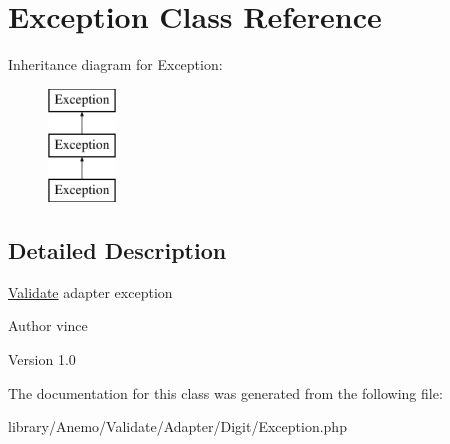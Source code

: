\hypertarget{class_anemo_1_1_validate_1_1_adapter_1_1_digit_1_1_exception}{
\section{Exception Class Reference}
\label{class_anemo_1_1_validate_1_1_adapter_1_1_digit_1_1_exception}
}
Inheritance diagram for Exception:\begin{figure}[H]
\begin{center}
\leavevmode
\includegraphics[height=3.000000cm]{class_anemo_1_1_validate_1_1_adapter_1_1_digit_1_1_exception}
\end{center}
\end{figure}


\subsection{Detailed Description}
\hyperlink{class_anemo_1_1_validate}{Validate} adapter exception \begin{DoxyAuthor}{Author}
vince 
\end{DoxyAuthor}
\begin{DoxyVersion}{Version}
1.0 
\end{DoxyVersion}


The documentation for this class was generated from the following file:\begin{DoxyCompactItemize}
\item 
library/Anemo/Validate/Adapter/Digit/Exception.php\end{DoxyCompactItemize}
